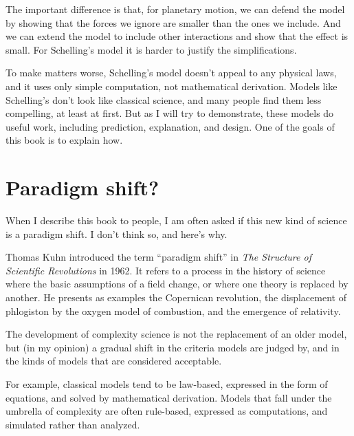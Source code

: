 \documentclass[12pt]{book}
\theoremstyle{exercise}
\begin{document}

The important difference is that, for planetary motion, we can defend
the model by showing that the forces we ignore are smaller than the
ones we include.  And we can extend the model to include other
interactions and show that the effect is small.  For Schelling's model
it is harder to justify the simplifications.


To make matters worse, Schelling's model doesn't appeal to any
physical laws, and it uses only simple computation, not mathematical
derivation.  Models like Schelling's don't look like classical
science, and many people find them less compelling, at least at first.
But as I will try to demonstrate, these models do useful work,
including prediction, explanation, and design.  One of the goals of
this book is to explain how.



\section{Paradigm shift?}

When I describe this book to people, I am often asked if this new kind
of science is a paradigm shift.  I don't think so, and here's why.


Thomas Kuhn introduced the term ``paradigm shift'' in {\em The
Structure of Scientific Revolutions} in 1962.  It refers to a process
in the history of science where the basic assumptions of a field
change, or where one theory is replaced by another.
He presents as examples the Copernican revolution, the displacement
of phlogiston by the oxygen model of combustion, and the emergence
of relativity.


The development of complexity science is not the replacement of
an older model, but (in my opinion) a gradual shift in the criteria
models are judged by, and in the kinds of models that are considered
acceptable.


For example, classical models tend to be law-based, expressed in the
form of equations, and solved by mathematical derivation.  Models that
fall under the umbrella of complexity are often rule-based,
expressed as computations, and simulated rather than analyzed.
\end{document}
